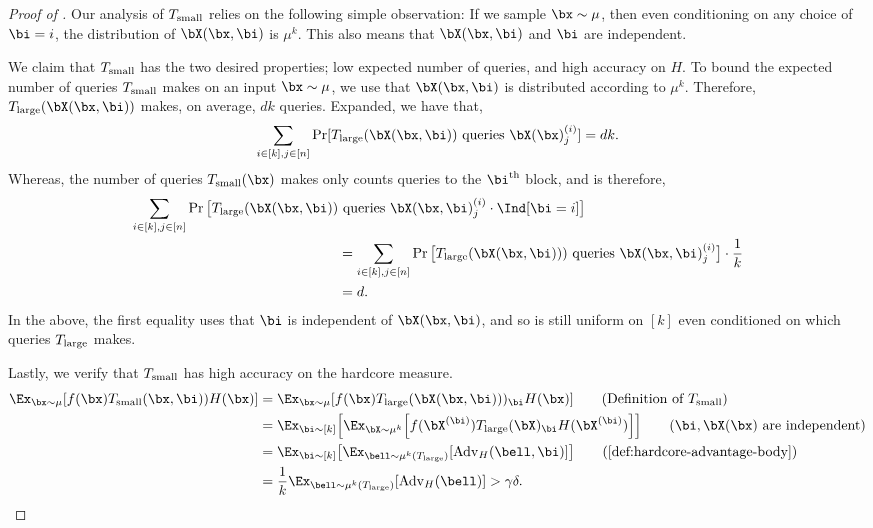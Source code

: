 \documentclass[11pt]{article}
\newcommand{\adv}{\mathrm{Adv}}
\DeclarePairedDelimiter\bracket{[}{]}
\begin{document}
\begin{proof}[Proof of ]
    Our analysis of $T_{\textnormal{small}}$ relies on the following simple observation: If we sample $\bx \sim \mu$, then even conditioning on any choice of $\bi = i$, the distribution of $\bX(\bx, \bi)$ is $\mu^k$. This also means that $\bX(\bx, \bi)$ and $\bi$ are independent.

    We claim that $T_{\textnormal{small}}$ has the two desired properties; low expected number of queries, and high accuracy on $H$. To bound the expected number of queries $T_{\textnormal{small}}$ makes on an input $\bx \sim \mu$, we use that $\bX(\bx, \bi)$ is distributed according to $\mu^k$. Therefore, $T_{\textnormal{large}}(\bX(\bx, \bi))$ makes, on average, $dk$ queries. Expanded, we have that,
    \begin{equation*}
        \sum_{i \in [k], j\in [n]}\Pr[T_{\textnormal{large}}(\bX(\bx, \bi))\text{ queries }\bX(\bx)^{(i)}_j] = dk.
    \end{equation*}
    Whereas, the number of queries $T_{\textnormal{small}}(\bx)$ makes only counts queries to the $\bi^{\text{th}}$ block, and is therefore,
    \begin{align*}
         \sum_{i \in [k], j\in [n]}\Pr\big[T_{\textnormal{large}}(\bX(\bx, \bi))&\text{ queries }\bX(\bx, \bi)^{(i)}_j \cdot \Ind[\bi = i]\big] \\
         &= \sum_{i \in [k], j\in [n]}\Pr\big[T_{\textnormal{large}}(\bX(\bx, \bi)))\text{ queries }\bX(\bx, \bi)^{(i)}_j\big] \cdot \frac{1}{k}\\
         &= d.
    \end{align*}
    In the above, the first equality uses that $\bi$ is independent of $\bX(\bx, \bi)$, and so is still uniform on $[k]$ even conditioned on which queries $T_{\textnormal{large}}$ makes.

    Lastly, we verify that $T_{\textnormal{small}}$ has high accuracy on the hardcore measure.
    \begin{align*}
        \Ex_{\bx \sim \mu}[ f(\bx) T_{\textnormal{small}}(\bx, \bi)) H(\bx)] &= \Ex_{\bx \sim \mu}[ f(\bx) T_{\textnormal{large}}(\bX(\bx, \bi)))_{\bi} H(\bx)] \tag{Definition of $T_{\textnormal{small}}$}  \\
        &=\Ex_{\bi \sim [k]}\bracket*{\Ex_{\bX \sim \mu^k}\bracket*{f(\bX^{(\bi)}) T_{\textnormal{large}}(\bX)_{\bi} H(\bX^{(\bi)})}} \tag{$\bi, \bX(\bx)$ are independent} \\
        &= \Ex_{\bi \sim [k]}\bracket*{\Ex_{\bell \sim \mu^k(T_{\textnormal{large}})}[\adv_H(\bell, \bi)]} \tag{\Cref{def:hardcore-advantage-body}}\\
        &= \frac{1}{k}\Ex_{\bell \sim \mu^k(T_{\textnormal{large}})}[\adv_H(\bell)] > \gamma \delta. \tag*{\qedhere}
    \end{align*}
\end{proof}
\end{document}
